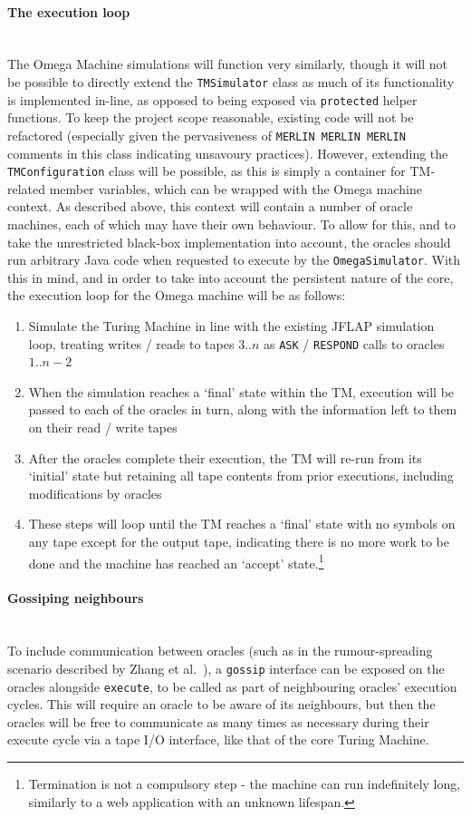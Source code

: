 \documentclass[12pt]{article}
\begin{document}
		\paragraph{The execution loop}\hfill\\
			The Omega Machine simulations will function very similarly, though it will not be possible to directly extend the \texttt{TMSimulator} class as much of its functionality is implemented in-line, as opposed to being exposed via \texttt{protected} helper functions. To keep the project scope reasonable, existing code will not be refactored (especially given the pervasiveness of \texttt{MERLIN MERLIN MERLIN} comments in this class indicating unsavoury practices).
			However, extending the \texttt{TMConfiguration} class will be possible, as this is simply a container for TM-related member variables, which can be wrapped with the Omega machine context.
			As described above, this context will contain a number of oracle machines, each of which may have their own behaviour. To allow for this, and to take the unrestricted black-box implementation into account, the oracles should run arbitrary Java code when requested to execute by the \texttt{OmegaSimulator}.
			With this in mind, and in order to take into account the persistent nature of the core, the execution loop for the Omega machine will be as follows:
			\begin{enumerate}
				\item Simulate the Turing Machine in line with the existing JFLAP simulation loop, treating writes / reads to tapes $3..n$ as \texttt{ASK} / \texttt{RESPOND} calls to oracles $1..n-2$
				\item When the simulation reaches a `final' state within the TM, execution will be passed to each of the oracles in turn, along with the information left to them on their read / write tapes
				\item After the oracles complete their execution, the TM will re-run from its `initial' state but retaining all tape contents from prior executions, including modifications by oracles
				\item These steps will loop until the TM reaches a `final' state with no symbols on any tape except for the output tape, indicating there is no more work to be done and the machine has reached an `accept' state.\footnote{Termination is not a compulsory step - the machine can run indefinitely long, similarly to a web application with an unknown lifespan.}
			\end{enumerate}
		\paragraph{Gossiping neighbours}\hfill\\
			To include communication between oracles (such as in the rumour-spreading scenario described by Zhang et al.~\cite{Zhang2014}), a \texttt{gossip} interface can be exposed on the oracles alongside \texttt{execute}, to be called as part of neighbouring oracles' execution cycles. 
			This will require an oracle to be aware of its neighbours, but then the oracles will be free to communicate as many times as necessary during their execute cycle via a tape I/O interface, like that of the core Turing Machine.
\end{document}
